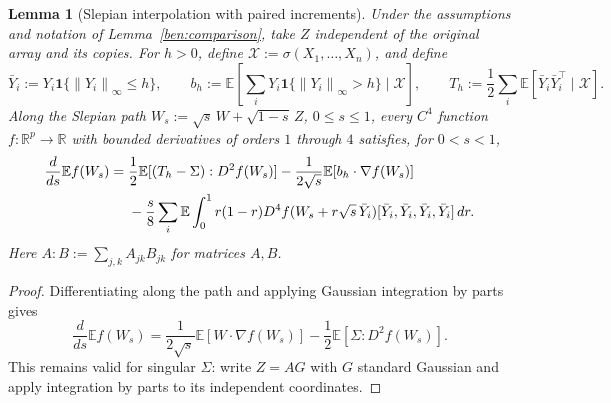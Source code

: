 \documentclass[11pt,letterpaper]{article}
\newenvironment{recovered}{}{}
\newtheorem{lemma}{Lemma}
\theoremstyle{remark}
\newcommand{\E}{\mathbb E}
\newcommand{\R}{\mathbb R}
\newcommand{\norm}[1]{\left\lVert#1\right\rVert}
\newcommand{\ind}{\mathbf 1}
\begin{document}
\begin{recovered}
\begin{lemma}[Slepian interpolation with paired increments]
\label{ben:paired-interpolation}
Under the assumptions and notation of Lemma~\ref{ben:comparison},
take \(Z\) independent of the original array and its copies. For
\(h>0\), {define} \(\mathcal X:=\sigma(X_1,\ldots,X_n)\), and define
\[
 \bar Y_i:=Y_i\ind\{\norm{Y_i}_\infty\le h\},\qquad
 b_h:=\E\left[\sum_iY_i\ind\{\norm{Y_i}_\infty>h\}
                    \mid\mathcal X\right],\qquad
 T_h:=\frac12\sum_i\E[\bar Y_i\bar Y_i^\top\mid\mathcal X].
\]
Along the Slepian path
\(W_s:=\sqrt s\,W+\sqrt{1-s}\,Z\), \(0\le s\le1\),
every \(C^4\) function \(f:\R^p\to\R\) with bounded derivatives
of orders \(1\) through \(4\) satisfies, for \(0<s<1\),
\begin{align}
 \frac d{ds}\E f(W_s)
 ={}&\frac12\E[(T_h-\Sigma):D^2f(W_s)]
       -\frac1{2\sqrt s}\E[b_h\cdot\nabla f(W_s)]\notag\\
 &-\frac{s}{8}\sum_i\E\int_0^1 r(1-r)
 D^4f(W_s+r\sqrt s\,\bar Y_i)
          [\bar Y_i,\bar Y_i,\bar Y_i,\bar Y_i]\,dr.
 \label{ben:slepian-identity}
\end{align}
Here \(A:B:=\sum_{j,k}A_{jk}B_{jk}\) for matrices \(A,B\).
\end{lemma}
\begin{proof}
Differentiating along the path and applying Gaussian integration by
parts gives
\begin{equation}\label{ben:slepian-initial}
 \frac d{ds}\E f(W_s)
 =\frac1{2\sqrt s}\E[W\cdot\nabla f(W_s)]
       -\frac12\E[\Sigma:D^2f(W_s)].
\end{equation}
This remains valid for singular \(\Sigma\): write \(Z=AG\) with
\(G\) standard Gaussian and apply integration by parts to its
independent coordinates.


\end{proof}
\end{recovered}
\end{document}
